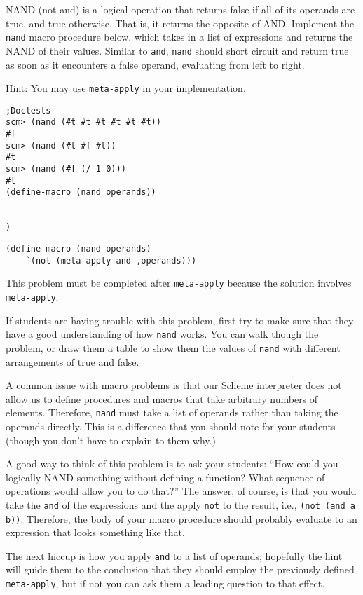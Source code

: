 \begin{blocksection}
\question NAND (not and) is a logical operation that returns false if all of its operands are true, and true otherwise. That is, it returns the opposite of AND. Implement the \lstinline{nand} macro procedure below, which takes in a list of expressions and returns the NAND of their values. Similar to \lstinline{and}, \lstinline{nand} should short circuit and return true as soon as it encounters a false operand, evaluating from left to right. 

Hint: You may use \lstinline{meta-apply} in your implementation. 

\begin{lstlisting}
;Doctests
scm> (nand (#t #t #t #t #t #t))
#f
scm> (nand (#t #f #t))
#t
scm> (nand (#f (/ 1 0)))
#t
(define-macro (nand operands))


)
\end{lstlisting}

\begin{solution}[1.5in]
\begin{lstlisting}
(define-macro (nand operands)
    `(not (meta-apply and ,operands)))
\end{lstlisting}
\end{solution}
\end{blocksection}

\begin{questionmeta}
This problem must be completed after \lstinline{meta-apply} because the solution involves \lstinline{meta-apply}. 

If students are having trouble with this problem, first try to make sure that they have a good understanding of how \lstinline{nand} works. You can walk though the problem, or draw them a table to show them the values of \lstinline{nand} with different arrangements of true and false. 

A common issue with macro problems is that our Scheme interpreter does not allow us to define procedures and macros that take arbitrary numbers of elements. Therefore, \lstinline{nand} must take a list of operands rather than taking the operands directly. This is a difference that you should note for your students (though you don't have to explain to them why.)

A good way to think of this problem is to ask your students: ``How could you logically NAND something without defining a function? What sequence of operations would allow you to do that?'' The answer, of course, is that you would take the \lstinline{and} of the expressions and the apply \lstinline{not} to the result, i.e., \lstinline{(not (and a b))}. Therefore, the body of your macro procedure should probably evaluate to an expression that looks something like that. 

The next hiccup is how you apply \lstinline{and} to a list of operands; hopefully the hint will guide them to the conclusion that they should employ the previously defined \lstinline{meta-apply}, but if not you can ask them a leading question to that effect. 
\end{questionmeta}